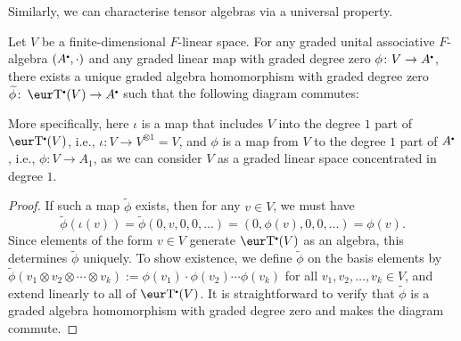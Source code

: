 Similarly, we can characterise tensor algebras via a universal property.
\begin{proposition}\label{prop:universal_property_tensor_algebra}
	Let $V$ be a finite-dimensional $F$-linear space. For any graded unital associative $F$-algebra $(A^{\smallbullet}, \cdot)$ and any graded linear map with graded degree zero $\phi \colon V \to A^{\smallbullet}$, there exists a unique graded algebra homomorphism with graded degree zero $\widetilde{\phi} \colon \T(V) \to A^{\smallbullet}$ such that the following diagram commutes:
	\begin{center}
	\end{center}
	More specifically, here $\iota$ is a map that includes $V$ into the degree $1$ part of $\T(V)$, i.e., $\iota \colon V \to V^{\otimes 1} = V$, and $\phi$ is a map from $V$ to the degree $1$ part of $A^{\smallbullet}$, i.e., $\phi \colon V \to A_1$, as we can consider $V$ as a graded linear space concentrated in degree $1$.
\end{proposition}
\begin{proof}
	If such a map $\widetilde{\phi}$ exists, then for any $v \in V$, we must have
	\[
		\widetilde{\phi}(\iota(v)) = \widetilde{\phi}(0, v, 0, 0, \ldots) = (0, \phi(v), 0, 0, \ldots) = \phi(v).
	\]
	Since elements of the form $v \in V$ generate $\T(V)$ as an algebra, this determines $\widetilde{\phi}$ uniquely. To show existence, we define $\widetilde{\phi}$ on the basis elements by $\widetilde{\phi}(v_1 \otimes v_2 \otimes \cdots \otimes v_k) := \phi(v_1) \cdot \phi(v_2) \cdots \phi(v_k)$ for all $v_1, v_2, \ldots, v_k \in V$, and extend linearly to all of $\T(V)$. It is straightforward to verify that $\widetilde{\phi}$ is a graded algebra homomorphism with graded degree zero and makes the diagram commute.
\end{proof}

